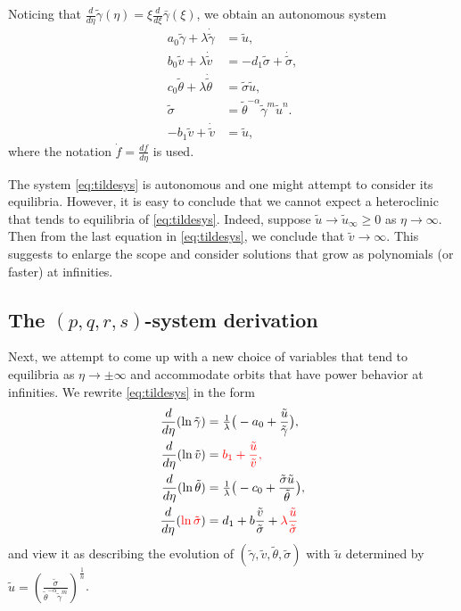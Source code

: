 \documentclass[a4paper,11pt]{article}
\def\red{\color{red}}
\def\bg{{\bar{\gamma}}}
\def\tg{{\tilde{\gamma}}}
\def\tv{{\tilde{v}}}
\def\tth{{\tilde{\theta}}}
\def\ts{{\tilde{\sigma}}}
\def\tu{{\tilde{u}}}
\def\dtg{{\dot{\tilde{\gamma}}}}
\def\dtv{{\dot{\tilde{v}}}}
\def\dtth{{\dot{\tilde{\theta}}}}
\def\dts{{\dot{\tilde{\sigma}}}}
\theoremstyle{remark}
\begin{document}
Noticing that $\frac{d}{d\eta}\tg(\eta) = \xi \frac{d}{d\xi}\bg(\xi)$, we obtain an autonomous system
\begin{equation} \label{eq:tildesys}
 \begin{aligned}
  a_0\tg + \lambda\dtg &=\tu,\\
  b_0\tv + \lambda\dtv &=-d_1 \ts + \dts,\\
  c_0\tth+ \lambda\dtth&=\ts\tu,\\
  \ts &=\tth^{-\alpha}\tg^m\tu^n.\\
  -b_1\tv+\dtv &= \tu,
 \end{aligned}
\end{equation}
where the notation $\dot{f}=\frac{df}{d\eta}$ is used.

The system \eqref{eq:tildesys} is autonomous and one might attempt to consider its equilibria. 
However, it is easy to conclude that we cannot expect a heteroclinic that  tends to equilibria of \eqref{eq:tildesys}.
Indeed, suppose $\tu \rightarrow \tu_\infty\ge 0$ as $\eta \rightarrow \infty$. 
Then from the last equation in \eqref{eq:tildesys}, 
we conclude that $\tv \rightarrow \infty$. %
This suggests to enlarge the scope and consider solutions that grow as polynomials (or faster) at infinities.




\subsection{The $(p,q,r,s)$-system derivation}
Next, we attempt to come up with a new choice of variables that tend to equilibria as $\eta \rightarrow \pm \infty$ and accommodate
orbits that have power behavior at infinities. We rewrite \eqref{eq:tildesys} in the form
\begin{equation}
 \label{eq:tildesys2}
\begin{aligned}
\frac{d}{d\eta}{(\ln{\tg})}  &=  \tfrac{1}{\lambda} \big (- a_0 +  \frac{\tu}{\tg} \big ),
\\
 \frac{d}{d\eta}{(\ln{\tv})}  &=  {\red b_1 + \frac{\tu}{\tv} , }
\\
\frac{d}{d\eta}{(\ln{\tth})} &=   \tfrac{1}{\lambda} \big (- c_0 +  \frac{\ts \tu}{\tth} \big ), 
\\
\frac{d}{d\eta}{( {\red \ln{\ts} } )} &= d_1 + b \frac{\tv}{\ts} +  {\red  \lambda \frac{\tu}{\ts}  }
\end{aligned}
\end{equation}
and view it as describing the evolution of $(\tg,\tv,\tth,\ts)$ with $\tu$ determined by $\tu = \left ( \frac{\ts}{ \tth^{-\alpha} \tg^m} \right )^\frac{1}{n}$.
\end{document}
